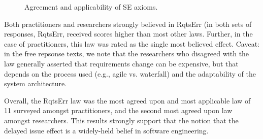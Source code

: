 \begin{figure}[!ht]
\caption{Agreement and applicability of SE axioms.}
\label{fig:survey_results}
\end{figure}

Both  practitioners and researchers  strongly believed in RqtsErr (in both sets of responses, RqtsErr, received  scores higher than most
other laws. Further, in the case of practitioners, this law was rated
as the single most believed effect. 
Caveat: in the free repsonse texts, we note that the researchers who disagreed with the law generally asserted that requirements change can be expensive, but that depends on the process used (e.g., agile vs. waterfall) and the adaptability of the system architecture.

Overall, the RqtsErr law was the most agreed upon and most applicable law of 11 surveyed amongst practitioners, and the second most agreed upon law amongst researchers. 
This results strongly support that the notion that the  delayed issue effect   is a widely-held belief in software engineering.